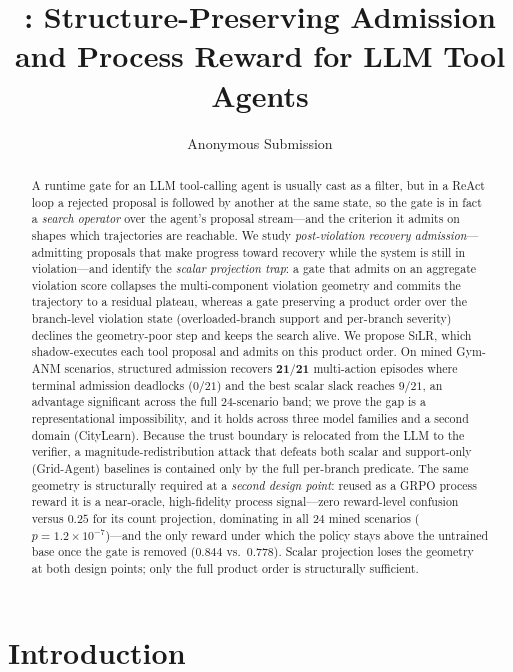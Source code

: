 \documentclass[letterpaper]{article} %
\title{\silr{}: Structure-Preserving Admission and Process Reward for LLM Tool Agents}
\author{Anonymous Submission}
\theoremstyle{plain}
\newcommand{\silr}{\textsc{SiLR}}
\begin{document}
\maketitle

\begin{abstract}
A runtime gate for an LLM tool-calling agent is usually cast as a filter, but in a ReAct loop a rejected proposal is followed by another at the same state, so the gate is in fact a \emph{search operator} over the agent's proposal stream---and the criterion it admits on shapes which trajectories are reachable. We study \emph{post-violation recovery admission}---admitting proposals that make progress toward recovery while the system is still in violation---and identify the \emph{scalar projection trap}: a gate that admits on an aggregate violation score collapses the multi-component violation geometry and commits the trajectory to a residual plateau, whereas a gate preserving a product order over the branch-level violation state (overloaded-branch support and per-branch severity) declines the geometry-poor step and keeps the search alive. We propose \silr{}, which shadow-executes each tool proposal and admits on this product order. On mined Gym-ANM scenarios, structured admission recovers $\mathbf{21/21}$ multi-action episodes where terminal admission deadlocks ($0/21$) and the best scalar slack reaches $9/21$, an advantage significant across the full $24$-scenario band; we prove the gap is a representational impossibility, and it holds across three model families and a second domain (CityLearn). Because the trust boundary is relocated from the LLM to the verifier, a magnitude-redistribution attack that defeats both scalar and support-only (Grid-Agent) baselines is contained only by the full per-branch predicate. The same geometry is structurally required at a \emph{second design point}: reused as a GRPO process reward it is a near-oracle, high-fidelity process signal---zero reward-level confusion versus $0.25$ for its count projection, dominating in all $24$ mined scenarios ($p{=}1.2{\times}10^{-7}$)---and the only reward under which the policy stays above the untrained base once the gate is removed ($0.844$ vs.\ $0.778$). Scalar projection loses the geometry at both design points; only the full product order is structurally sufficient.
\end{abstract}

\section{Introduction}
\label{sec:intro}
\end{document}
